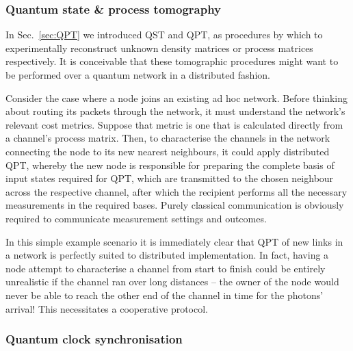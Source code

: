 \cite{DomBerry}

%
%

\subsubsection{Quantum state \& process tomography}  

In Sec.~\ref{sec:QPT} we introduced QST and QPT, as procedures by which to experimentally reconstruct unknown density matrices or process matrices respectively. It is conceivable that these tomographic procedures might want to be performed over a quantum network in a distributed fashion.

Consider the case where a node joins an existing ad hoc network. Before thinking about routing its packets through the network, it must understand the network's relevant cost metrics. Suppose that metric is one that is calculated directly from a channel's process matrix. Then, to characterise the channels in the network connecting the node to its new nearest neighbours, it could apply distributed QPT, whereby the new node is responsible for preparing the complete basis of input states required for QPT, which are transmitted to the chosen neighbour across the respective channel, after which the recipient performs all the necessary measurements in the required bases. Purely classical communication is obviously required to communicate measurement settings and outcomes.

In this simple example scenario it is immediately clear that QPT of new links in a network is perfectly suited to distributed implementation. In fact, having a node attempt to characterise a channel from start to finish could be entirely unrealistic if the channel ran over long distances -- the owner of the node would never be able to reach the other end of the channel in time for the photons' arrival! This necessitates a cooperative protocol.

%
%

\subsubsection{Quantum clock synchronisation} \label{sec:clock_sync}


